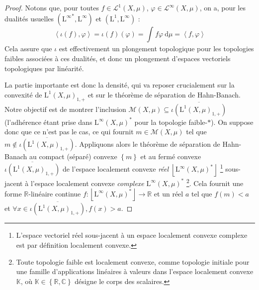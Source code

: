 \documentclass[a4paper,12pt]{article}
\newcommand{\R}{\mathbb{R}}
\newcommand{\C}{\mathbb{C}}
\newcommand{\K}{\mathbb{K}}
\newcommand{\ket}[1]{\left\langle #1 \right\rangle}
\newcommand{\floor}[1]{\left\lfloor #1 \right\rfloor}
\newcommand{\set}[1]{\left\{ #1 \right\}}
\newcommand{\integral}[4]{\int_{#1}^{#2} #3~\mathrm{d}#4}
\newcommand{\closure}[1]{\overline{#1}}
\begin{document}
\begin{proof}
    Notons que, pour toutes $f\in\mathscr{L}^1(X, \mu)$, $\varphi\in\mathscr{L}^\infty(X, \mu)$, on a, pour les dualités usuelles 
    $({\mathrm{L}^\infty}^*, \mathrm{L}^\infty)$ et $(\mathrm{L}^1, \mathrm{L}^\infty)$ :
    \begin{equation*}
        \ket{\iota(f), \varphi} = \iota(f)(\varphi) = \integral{}{}{f\varphi}{\mu} = \ket{f, \varphi}
    \end{equation*}
    Cela assure que $\iota$ est effectivement un plongement topologique pour les topologies faibles associées à ces dualités,
    et donc un plongement d'espaces vectoriels topologiques par linéarité.

    La partie importante est donc la densité, qui va reposer crucialement sur la convexité de $\mathrm{L}^1(X, \mu)_{1, +}$ et sur le théorème de séparation de Hahn-Banach.
    Notre objectif est de montrer l'inclusion $\mathcal{M}(X, \mu)\subseteq\closure{\iota(\mathrm{L}^1(X, \mu)_{1, +})}$ (l'adhérence étant prise dans 
    ${\mathrm{L}^\infty(X,\mu)}^*$ pour la topologie faible-$*$). On suppose donc que ce n'est pas le cas, ce qui fournit
    $m\in\mathcal{M}(X, \mu)$ tel que $m\notin\closure{\iota(\mathrm{L}^1(X, \mu)_{1, +})}$. Appliquons alors le théorème de séparation de
    Hahn-Banach au compact (séparé) convexe $\set{m}$ et au fermé convexe $\closure{\iota(\mathrm{L}^1(X, \mu)_{1, +})}$
    de l'espace localement convexe \emph{réel} $\floor{\mathrm{L}^\infty(X,\mu)^*}$
    \footnote{L'espace vectoriel réel sous-jacent à un espace localement convexe complexe
    est par définition localement convexe. } 
    sous-jacent à l'espace localement convexe \emph{complexe} $\mathrm{L}^\infty(X,\mu)^*$
    \footnote{Toute topologie faible est localement convexe, comme topologie initiale 
    pour une famille d'applications linéaires à valeurs dans l'espace localement convexe $\K$, où $\K\in\set{\R, \C}$ 
    désigne le corps des scalaires. }. 
    Cela fournit une forme $\R$-linéaire continue $f : \floor{\mathrm{L}^\infty(X,\mu)^*} \to \R$ et un réel 
    $a$ tel que $f(m)<a$ et $\forall x\in \closure{\iota(\mathrm{L}^1(X, \mu)_{1, +})}, f(x)>a$. 


\end{proof}
\end{document}
